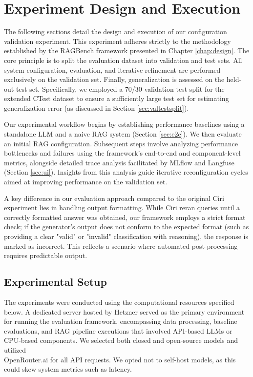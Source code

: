 \section{Experiment Design and Execution} \label{sec:exp_design_exec}
The following sections detail the design and execution of our configuration validation experiment. This experiment adheres strictly to the methodology established by the RAGBench framework presented in Chapter \ref{chap:design}. The core principle is to split the evaluation dataset into validation and test sets. All system configuration, evaluation, and iterative refinement are performed exclusively on the validation set. Finally, generalization is assessed on the held-out test set. Specifically, we employed a 70/30 validation-test split for the extended CTest dataset to ensure a sufficiently large test set for estimating generalization error (as discussed in Section \ref{sec:valtestsplit}).

Our experimental workflow begins by establishing performance baselines using a standalone LLM and a naive RAG system (Section \ref{sec:e2e}). We then evaluate an initial RAG configuration. Subsequent steps involve analyzing performance bottlenecks and failures using the framework's end-to-end and component-level metrics, alongside detailed trace analysis facilitated by MLflow and Langfuse (Section \ref{sec:ui}). Insights from this analysis guide iterative reconfiguration cycles aimed at improving performance on the validation set.

A key difference in our evaluation approach compared to the original Ciri experiment \cite{Lian.2024} lies in handling output formatting. While Ciri reran queries until a correctly formatted answer was obtained, our framework employs a strict format check; if the generator's output does not conform to the expected format (such as providing a clear "valid" or "invalid" classification with reasoning), the response is marked as incorrect. This reflects a scenario where automated post-processing requires predictable output.


\subsection{Experimental Setup} \label{sec:exp_setup}
The experiments were conducted using the computational resources specified below. A dedicated server hosted by Hetzner served as the primary environment for running the evaluation framework, encompassing data processing, baseline evaluations, and RAG pipeline executions that involved API-based LLMs or CPU-based components. We selected both closed and open-source models and utilized \\OpenRouter.ai \cite{openrouter-inc-2023} for all API requests. We opted not to self-host models, as this could skew system metrics such as latency.

